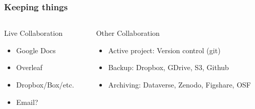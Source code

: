 \documentclass[14pt]{beamer}
\begin{document}
\begin{frame}

\frametitle{Keeping things}

\begin{columns}[T]
\begin{column}{0.5\textwidth}
\begin{block}{Live Collaboration}
\begin{itemize}\itemsep2em
\item<2-> Google Docs
\item<2-> Overleaf
\item<2-> Dropbox/Box/etc.
\item<2-> Email?
\end{itemize}
\end{block}
\end{column}
\begin{column}{0.5\textwidth}
\begin{block}{Other Collaboration}
\begin{itemize}
\item<3-> Active project: Version control (git)
\item<3-> Backup: Dropbox, GDrive, S3, Github

\vspace{1em}

\item<4-> Archiving: Dataverse, Zenodo, Figshare, OSF
\end{itemize}
\end{block}
\end{column}
\end{columns}

\end{frame}


\end{document}
